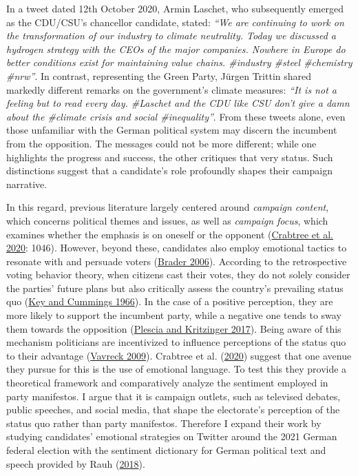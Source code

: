\documentclass[a4paper,11pt]{article}
\begin{document}
In a tweet dated 12th October 2020, Armin Laschet, who subsequently emerged as the CDU/CSU's chancellor candidate, stated: \emph{``We are continuing to work on the transformation of our industry to climate neutrality. Today we discussed a hydrogen strategy with the CEOs of the major companies. Nowhere in Europe do better conditions exist for maintaining value chains. \#industry \#steel \#chemistry \#nrw''}. In contrast, representing the Green Party, Jürgen Trittin shared markedly different remarks on the government's climate measures: \emph{``It is not a feeling but to read every day. \#Laschet and the CDU like CSU don't give a damn about the \#climate crisis and social \#inequality''}. From these tweets alone, even those unfamiliar with the German political system may discern the incumbent from the opposition. The messages could not be more different; while one highlights the progress and success, the other critiques that very status. Such distinctions suggest that a candidate's role profoundly shapes their campaign narrative.

In this regard, previous literature largely centered around \emph{campaign content}, which concerns political themes and issues, as well as \emph{campaign focus}, which examines whether the emphasis is on oneself or the opponent (\protect\hyperlink{ref-crabtreeItNotOnly2020}{Crabtree et al. 2020}: 1046). However, beyond these, candidates also employ emotional tactics to resonate with and persuade voters (\protect\hyperlink{ref-braderCampaigningHeartsMinds2006}{Brader 2006}). According to the retrospective voting behavior theory, when citizens cast their votes, they do not solely consider the parties' future plans but also critically assess the country's prevailing status quo (\protect\hyperlink{ref-keyResponsibleElectorateRationality1966}{Key and Cummings 1966}). In the case of a positive perception, they are more likely to support the incumbent party, while a negative one tends to sway them towards the opposition (\protect\hyperlink{ref-plesciaRetrospectiveVotingParty2017}{Plescia and Kritzinger 2017}). Being aware of this mechanism politicians are incentivized to influence perceptions of the status quo to their advantage (\protect\hyperlink{ref-vavreckMessageMattersEconomy2009}{Vavreck 2009}). Crabtree et al. (\protect\hyperlink{ref-crabtreeItNotOnly2020}{2020}) suggest that one avenue they pursue for this is the use of emotional language. To test this they provide a theoretical framework and comparatively analyze the sentiment employed in party manifestos. I argue that it is campaign outlets, such as televised debates, public speeches, and social media, that shape the electorate's perception of the status quo rather than party manifestos. Therefore I expand their work by studying candidates' emotional strategies on Twitter around the 2021 German federal election with the sentiment dictionary for German political text and speech provided by Rauh (\protect\hyperlink{ref-rauhValidatingSentimentDictionary2018}{2018}).
\end{document}
